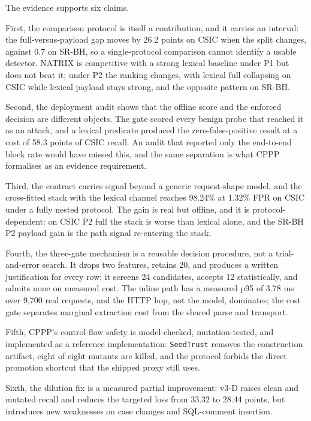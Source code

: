 \documentclass[preprint,11pt]{elsarticle}
\begin{document}
The evidence supports six claims.

First, the comparison protocol is itself a contribution, and it carries
an interval: the full-versus-payload gap moves by 26.2 points on CSIC
when the split changes, against 0.7 on SR-BH, so a single-protocol
comparison cannot identify a usable detector. NATRIX is competitive with
a strong lexical baseline under P1 but does not beat it; under P2 the
ranking changes, with lexical full collapsing on CSIC while lexical
payload stays strong, and the opposite pattern on SR-BH.

Second, the deployment audit shows that the offline score and the
enforced decision are different objects. The gate scored every benign
probe that reached it as an attack, and a lexical predicate produced the
zero-false-positive result at a cost of 58.3 points of CSIC recall. An
audit that reported only the end-to-end block rate would have missed
this, and the same separation is what CPPP formalises as an evidence
requirement.

Third, the contract carries signal beyond a generic request-shape model,
and the cross-fitted stack with the lexical channel reaches 98.24\% at
1.32\% FPR on CSIC under a fully nested protocol. The gain is real but
offline, and it is protocol-dependent: on CSIC P2 full the stack is
worse than lexical alone, and the SR-BH P2 payload gain is the path
signal re-entering the stack.

Fourth, the three-gate mechanism is a reusable decision procedure, not a
trial-and-error search. It drops two features, retains 20, and produces
a written justification for every row; it screens 24 candidates, accepts
12 statistically, and admits none on measured cost. The inline path has
a measured p95 of 3.78 ms over 9,700 real requests, and the HTTP hop,
not the model, dominates; the cost gate separates marginal extraction
cost from the shared parse and transport.

Fifth, CPPP's control-flow safety is model-checked, mutation-tested, and
implemented as a reference implementation: \texttt{Seed\allowbreak{}Trust} removes
the construction artifact, eight of eight mutants are killed, and the
protocol forbids the direct promotion shortcut that the shipped proxy
still uses.

Sixth, the dilution fix is a measured partial improvement: v3-D raises
clean and mutated recall and reduces the targeted loss from 33.32 to
28.44 points, but introduces new weaknesses on case changes and
SQL-comment insertion.
\end{document}
